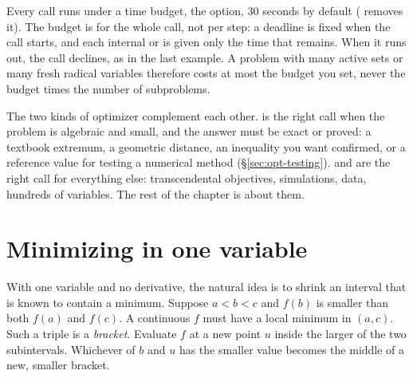 Every call runs under a time budget, the  option, 30
seconds by default ( removes it). The budget
is for the whole call, not per step: a deadline is fixed when the call starts,
and each internal  or  is given only the time that
remains. When it runs out, the call declines, as in the last example. A
problem with many active sets or many fresh radical variables therefore costs at
most the budget you set, never the budget times the number of subproblems.


The two kinds of optimizer complement each other.  is the right
call when the problem is algebraic and small, and the answer must be exact or
proved: a textbook extremum, a geometric distance, an inequality you want
confirmed, or a reference value for testing a numerical method
(\S\ref{sec:opt-testing}).  and  are the
right call for everything else: transcendental objectives, simulations, data,
hundreds of variables. The rest of the chapter is about them.

\section{Minimizing in one variable}
\label{sec:opt-brent}

With one variable and no derivative, the natural idea is to shrink an interval
that is known to contain a minimum. Suppose \(a < b < c\) and \(f(b)\) is
smaller than both \(f(a)\) and \(f(c)\). A continuous \(f\) must have a local
minimum in \((a, c)\). Such a triple is a \emph{bracket}.
Evaluate \(f\) at a new point \(u\) inside the larger of the two subintervals.
Whichever of \(b\) and \(u\) has the smaller value becomes the middle of a new,
smaller bracket.


